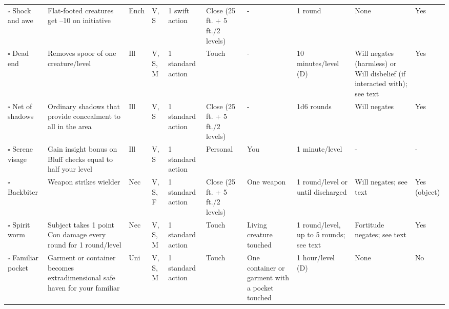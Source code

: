 \documentclass[12pt, a4paper]{article}
\begin{document}
\begin{center}
\begin{longtable}[H]{ p{8em} p{15em} p{2em} p{5em} p{6em} p{6em} p{10em} p{6em} p{5em} p{2em} }
    \(\square\) Shock and awe & Flat-footed creatures get –10 on initiative & Ench & V, S & 1 swift action & Close (25 ft. + 5 ft./2 levels) & - & 1 round & None & Yes\\
    \(\square\) Dead end & Removes spoor of one creature/level & Ill & V, S, M & 1 standard action & Touch & - & 10 minutes/level (D) & Will negates (harmless) or Will disbelief (if interacted with); see text & Yes\\
    \(\square\) Net of shadows & Ordinary shadows that provide concealment to all in the area & Ill & V, S & 1 standard action & Close (25 ft. + 5 ft./2 levels) & - & 1d6 rounds & Will negates & Yes\\
    \(\square\) Serene visage & Gain insight bonus on Bluff checks equal to half your level & Ill & V, S & 1 standard action & Personal & You & 1 minute/level & - & -\\
    \(\square\) Backbiter & Weapon strikes wielder & Nec & V, S, F & 1 standard action & Close (25 ft. + 5 ft./2 levels) & One weapon & 1 round/level or until discharged & Will negates; see text & Yes (object)\\
    \(\square\) Spirit worm & Subject takes 1 point Con damage every round for 1 round/level & Nec & V, S, M & 1 standard action & Touch & Living creature touched & 1 round/level, up to 5 rounds; see text & Fortitude negates; see text & Yes\\
    \(\square\) Familiar pocket & Garment or container becomes extradimensional safe haven for your familiar & Uni & V, S, M & 1 standard action & Touch & One container or garment with a pocket touched & 1 hour/level (D) & None & No\\
  \end{longtable}


\end{center}
\end{document}

